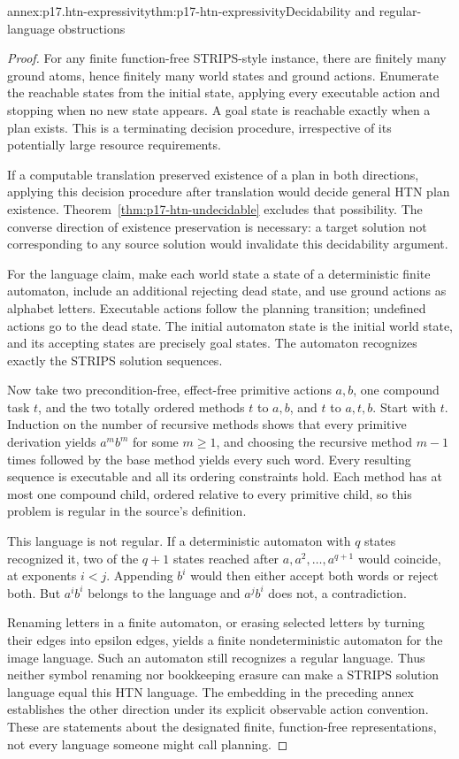 \begin{annexitem}{annex:p17.htn-expressivity}{thm:p17-htn-expressivity}{Decidability and regular-language obstructions}
\begin{proof}
For any finite function-free STRIPS-style instance, there are finitely many
ground atoms, hence finitely many world states and ground actions. Enumerate
the reachable states from the initial state, applying every executable action
and stopping when no new state appears. A goal state is reachable exactly
when a plan exists. This is a terminating decision procedure, irrespective
of its potentially large resource requirements.

If a computable translation preserved existence of a plan in both directions,
applying this decision procedure after translation would decide general HTN
plan existence. Theorem~\ref{thm:p17-htn-undecidable} excludes that possibility.
The converse direction of existence preservation is necessary: a target
solution not corresponding to any source solution would invalidate this
decidability argument.

For the language claim, make each world state a state of a deterministic
finite automaton, include an additional rejecting dead state, and use ground
actions as alphabet letters. Executable actions follow the planning transition;
undefined actions go to the dead state. The initial automaton state is the
initial world state, and its accepting states are precisely goal states.
The automaton recognizes exactly the STRIPS solution sequences.

Now take two precondition-free, effect-free primitive actions \(a,b\), one
compound task \(t\), and the two totally ordered methods
\(t\) to \(a,b\), and \(t\) to \(a,t,b\). Start with \(t\).
Induction on the number of recursive methods shows that every primitive
derivation yields \(a^m b^m\) for some \(m\geq1\), and choosing the
recursive method \(m-1\) times followed by the base method yields every
such word. Every resulting sequence is executable and all its ordering
constraints hold. Each method has at most one compound child, ordered
relative to every primitive child, so this problem is regular in the source's
definition.

This language is not regular. If a deterministic automaton with \(q\) states
recognized it, two of the \(q+1\) states reached after
\(a,a^2,\ldots,a^{q+1}\) would coincide, at exponents \(i<j\).
Appending \(b^i\) would then either accept both words or reject both.
But \(a^i b^i\) belongs to the language and \(a^j b^i\) does not,
a contradiction.

Renaming letters in a finite automaton, or erasing selected letters by turning
their edges into epsilon edges, yields a finite nondeterministic automaton
for the image language. Such an automaton still recognizes a regular
language. Thus neither symbol renaming nor bookkeeping erasure can make a
STRIPS solution language equal this HTN language. The embedding in the
preceding annex establishes the other direction under its explicit observable
action convention. These are statements about the designated finite,
function-free representations, not every language someone might call planning.
\end{proof}
\end{annexitem}
